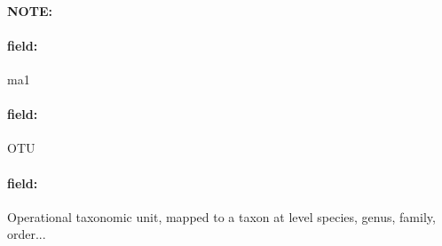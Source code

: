 \documentclass[12pt]{article}
\newenvironment{note}{\paragraph{NOTE:}}{}
\newenvironment{field}{\paragraph{field:}}{}
\begin{document}
\begin{note}
    \begin{field}
        ma1
    \end{field}
    \begin{field}
        OTU
    \end{field}
    \begin{field}
        Operational taxonomic unit, mapped to a taxon at level species, genus, family, order...
    \end{field}
\end{note}
\end{document}
